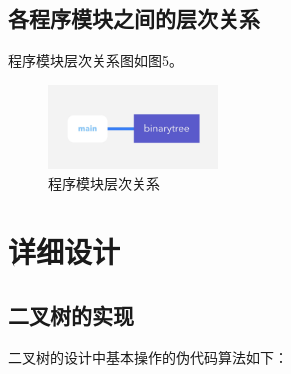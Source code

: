 \documentclass{article}
\begin{document}
\subsection{各程序模块之间的层次关系}

程序模块层次关系图如图5。

\begin{figure}[htbp]

    \centering\includegraphics[width=0.4\textwidth]{./Images/pic4_1_1.png}

    \caption{程序模块层次关系}

\end{figure}

\section{详细设计}

\subsection{二叉树的实现}

二叉树的设计中基本操作的伪代码算法如下：
\end{document}
